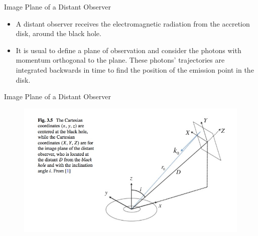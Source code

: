 \documentclass{beamer}
\begin{document}
\begin{darkframes}
\begin{frame}{Image Plane of a Distant Observer}
    \begin{itemize}
    \item A distant observer receives the electromagnetic radiation from the accretion disk, around the black hole.
    \pause
    \item It is usual to define a plane of observation and consider the photons with momentum orthogonal to the plane. These photons' trajectories are integrated backwards in time to find the position of the emission point in the disk.
    \end{itemize}
\end{frame}

\end{darkframes}
\begin{frame}{Image Plane of a Distant Observer}
	\begin{center}
      \begin{figure}
      	\includegraphics[scale=0.35] {figures/diskobservation.jpeg}
      \end{figure}
	\end{center}	
\end{frame}
\end{document}
